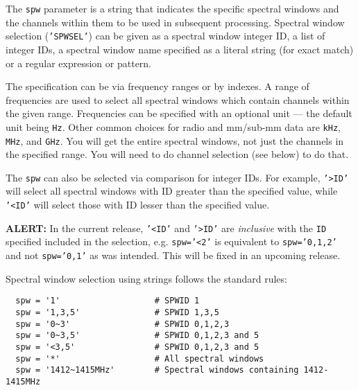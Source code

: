 The {\tt spw} parameter is a string that indicates the specific
spectral windows and the channels within them to be used in subsequent
processing. Spectral window selection ({\tt 'SPWSEL'}) can be given as
a spectral window integer ID, a list of integer IDs, a spectral window
name specified as a literal string (for exact match) or a regular
expression or pattern. 

The specification can be via frequency ranges or by indexes.  
A range of frequencies are
used to select all spectral windows which contain channels within the
given range. Frequencies can be specified with an optional unit ---
the default unit being {\tt Hz}.  Other common choices for radio and
mm/sub-mm data are {\tt kHz}, {\tt MHz}, and {\tt GHz}.  You will get
the entire spectral windows, not just the channels in the specified
range.  You will need to do channel selection (see below) to do that.

The {\tt spw} can also be selected via comparison for
integer IDs.  For example, {\tt '>ID'} will select all spectral
windows with ID greater than the specified value, while {\tt '<ID'}
will select those with ID lesser than the specified value.

{\bf ALERT:} In the current release, {\tt '<ID'} and
{\tt '>ID'} are {\em inclusive} with the {\tt ID} specified included
in the selection, e.g. {\tt spw='<2'} is equivalent to 
{\tt spw='0,1,2'} and not {\tt spw='0,1'} as was intended.  This will
be fixed in an upcoming release.

Spectral window selection using strings follows the standard rules:
\small
\begin{verbatim}
  spw = '1'                   # SPWID 1
  spw = '1,3,5'               # SPWID 1,3,5
  spw = '0~3'                 # SPWID 0,1,2,3
  spw = '0~3,5'               # SPWID 0,1,2,3 and 5
  spw = '<3,5'                # SPWID 0,1,2,3 and 5
  spw = '*'                   # All spectral windows
  spw = '1412~1415MHz'        # Spectral windows containing 1412-1415MHz
\end{verbatim}
\normalsize


